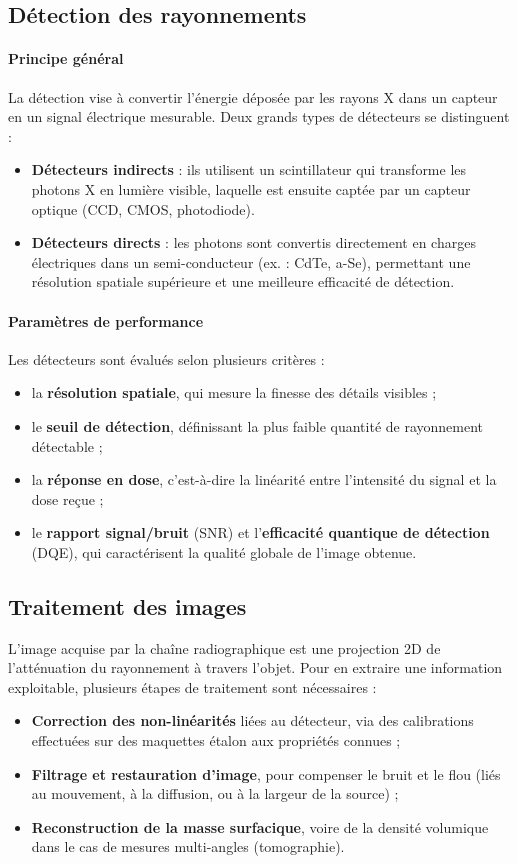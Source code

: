 \documentclass[12pt,a4paper]{report}
\begin{document}
\subsection{Détection des rayonnements}
\paragraph{Principe général} La détection vise à convertir l’énergie déposée par les rayons X dans un capteur en un signal électrique mesurable. Deux grands types de détecteurs se distinguent :
\begin{itemize}
\item \textbf{Détecteurs indirects} : ils utilisent un scintillateur qui transforme les photons X en lumière visible, laquelle est ensuite captée par un capteur optique (CCD, CMOS, photodiode).
\item \textbf{Détecteurs directs} : les photons sont convertis directement en charges électriques dans un semi-conducteur (ex. : CdTe, a-Se), permettant une résolution spatiale supérieure et une meilleure efficacité de détection.
\end{itemize}

\paragraph{Paramètres de performance} Les détecteurs sont évalués selon plusieurs critères :
\begin{itemize}
\item la \textbf{résolution spatiale}, qui mesure la finesse des détails visibles ;
\item le \textbf{seuil de détection}, définissant la plus faible quantité de rayonnement détectable ;
\item la \textbf{réponse en dose}, c’est-à-dire la linéarité entre l’intensité du signal et la dose reçue ;
\item le \textbf{rapport signal/bruit} (SNR) et l’\textbf{efficacité quantique de détection} (DQE), qui caractérisent la qualité globale de l’image obtenue.
\end{itemize}

\subsection{Traitement des images}
L’image acquise par la chaîne radiographique est une projection 2D de l’atténuation du rayonnement à travers l’objet. Pour en extraire une information exploitable, plusieurs étapes de traitement sont nécessaires :
\begin{itemize}
\item \textbf{Correction des non-linéarités} liées au détecteur, via des calibrations effectuées sur des maquettes étalon aux propriétés connues ;
\item \textbf{Filtrage et restauration d’image}, pour compenser le bruit et le flou (liés au mouvement, à la diffusion, ou à la largeur de la source) ;
\item \textbf{Reconstruction de la masse surfacique}, voire de la densité volumique dans le cas de mesures multi-angles (tomographie).
\end{itemize}
\end{document}
